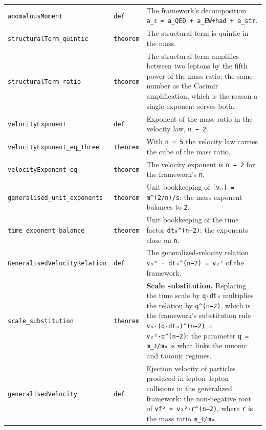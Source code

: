 \documentclass[11pt,a4paper]{article}
\begin{document}
\begin{center}
\begin{longtable}{@{}p{}p{}p{}@{}}
\texttt{anomalousMoment} & \texttt{def} & \small The framework's decomposition \texttt{a\_\allowbreak{}ℓ = a\_\allowbreak{}QED + a\_\allowbreak{}EW+had + a\_\allowbreak{}str}. \\
\texttt{structuralTerm\_\allowbreak{}quintic} & \texttt{theorem} & \small The structural term is quintic in the mass. \\
\texttt{structuralTerm\_\allowbreak{}ratio} & \texttt{theorem} & \small The structural term amplifies between two leptons by the fifth power of the mass ratio: the same number as the Casimir amplification, which is the reason a single exponent serves both. \\
\texttt{velocityExponent} & \texttt{def} & \small Exponent of the mass ratio in the velocity law, \texttt{n − 2}. \\
\texttt{velocityExponent\_\allowbreak{}eq\_\allowbreak{}three} & \texttt{theorem} & \small With \texttt{n = 5} the velocity law carries the cube of the mass ratio. \\
\texttt{velocityExponent\_\allowbreak{}eq} & \texttt{theorem} & \small The velocity exponent is \texttt{n − 2} for the framework's \texttt{n}. \\
\texttt{generalised\_\allowbreak{}unit\_\allowbreak{}exponents} & \texttt{theorem} & \small Unit bookkeeping of \texttt{[vₙ] = m\textasciicircum{}(2/n)/s}: the mass exponent balances to \texttt{2}. \\
\texttt{time\_\allowbreak{}exponent\_\allowbreak{}balance} & \texttt{theorem} & \small Unit bookkeeping of the time factor \texttt{dt₀\textasciicircum{}(n−2)}: the exponents close on \texttt{n}. \\
\texttt{GeneralisedVelocityRelation} & \texttt{def} & \small The generalized-velocity relation \texttt{vₙⁿ · dt₀\textasciicircum{}(n−2) = v₂²} of the framework. \\
\texttt{scale\_\allowbreak{}substitution} & \texttt{theorem} & \small \textbf{Scale substitution.}  Replacing the time scale by \texttt{q·dt₀} multiplies the relation by \texttt{q\textasciicircum{}(n−2)}, which is the framework's substitution rule \texttt{vₙ·(q·dt₀)\textasciicircum{}(n−2) = v₂²·q\textasciicircum{}(n−2)}; the parameter \texttt{q = m\_\allowbreak{}ℓ/m₀} is what links the muonic and tauonic regimes. \\
\texttt{generalisedVelocity} & \texttt{def} & \small Ejection velocity of particles produced in lepton–lepton collisions in the generalized framework: the non-negative root of \texttt{vf² = v₂²·r\textasciicircum{}(n−2)}, where \texttt{r} is the mass ratio \texttt{m\_\allowbreak{}ℓ/m₀}. \\

\end{longtable}
\end{center}
\end{document}

